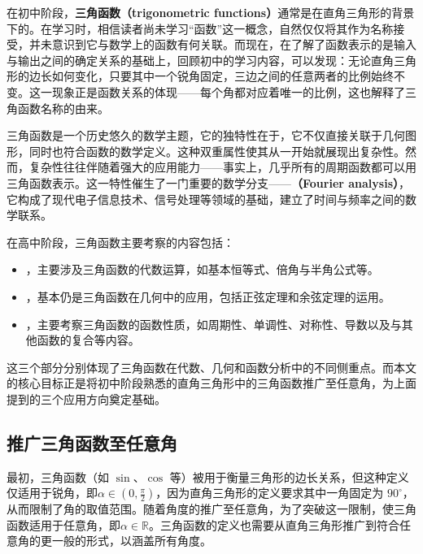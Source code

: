 
在初中阶段，\textbf{三角函数（trigonometric functions）}通常是在直角三角形的背景下的。在学习时，相信读者尚未学习“函数”这一概念，自然仅仅将其作为名称接受，并未意识到它与数学上的函数有何关联。而现在，在了解了函数表示的是输入与输出之间的确定关系的基础上，回顾初中的学习内容，可以发现：无论直角三角形的边长如何变化，只要其中一个锐角固定，三边之间的任意两者的比例始终不变。这一现象正是函数关系的体现——每个角都对应着唯一的比例，这也解释了三角函数名称的由来。

三角函数是一个历史悠久的数学主题，它的独特性在于，它不仅直接关联于几何图形，同时也符合函数的数学定义。这种双重属性使其从一开始就展现出复杂性。然而，复杂性往往伴随着强大的应用能力——事实上，几乎所有的周期函数都可以用三角函数表示。这一特性催生了一门重要的数学分支——\textbf{（Fourier analysis）}，它构成了现代电子信息技术、信号处理等领域的基础，建立了时间与频率之间的数学联系。

在高中阶段，三角函数主要考察的内容包括：

\begin{itemize}
\item {}，主要涉及三角函数的代数运算，如基本恒等式、倍角与半角公式等。
\item {}，基本仍是三角函数在几何中的应用，包括正弦定理和余弦定理的运用。
\item {}，主要考察三角函数的函数性质，如周期性、单调性、对称性、导数以及与其他函数的复合等内容。
\end{itemize}

这三个部分分别体现了三角函数在代数、几何和函数分析中的不同侧重点。而本文的核心目标正是将初中阶段熟悉的直角三角形中的三角函数推广至任意角，为上面提到的三个应用方向奠定基础。

\subsection{推广三角函数至任意角}\label{sub_HsTrFu_1}

最初，三角函数（如 $\sin$、$\cos$ 等）被用于衡量三角形的边长关系，但这种定义仅适用于锐角，即$\displaystyle\alpha\in(0,\frac{\pi}{2})$，因为直角三角形的定义要求其中一角固定为 $90^\circ$，从而限制了角的取值范围。随着角度的推广至任意角，为了突破这一限制，使三角函数适用于任意角，即$\alpha\in\mathbb{R}$。三角函数的定义也需要从直角三角形推广到符合任意角的更一般的形式，以涵盖所有角度。

